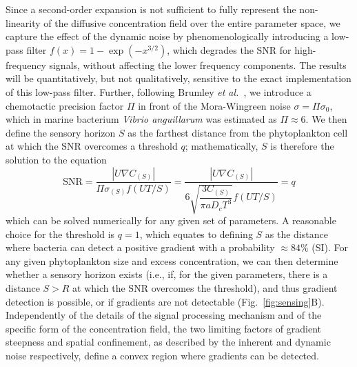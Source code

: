 \documentclass[9pt,twocolumn,twoside]{pnas-new}
\newcommand{\SNR}{\mathrm{SNR}}
\begin{document}
Since a second-order expansion is not sufficient to fully represent the non-linearity of the diffusive concentration field over the entire parameter space, we capture the effect of the dynamic noise by phenomenologically introducing a low-pass filter $f(x)=1-\exp(-x^{3/2})$, which degrades the $\SNR$ for high-frequency signals, without affecting the lower frequency components. The results will be quantitatively, but not qualitatively, sensitive to the exact implementation of this low-pass filter.
Further, following Brumley \textit{et al.}~\cite{brumley2019bacteria}, we introduce a chemotactic precision factor $\Pi$ in front of the Mora-Wingreen noise $\sigma = \Pi\sigma_0$, which in marine bacterium \textit{Vibrio anguillarum} was estimated as $\Pi\approx6$.
We then define the sensory horizon $S$ as the farthest distance from the phytoplankton cell at which the $\SNR$ overcomes a threshold $q$; mathematically, $S$ is therefore the solution to the equation
\begin{equation}
  \SNR = \dfrac{|U\nabla C_{(S)}|}{\Pi\sigma_{(S)}f(UT/S)} =
    \dfrac{|U\nabla C_{(S)}|}{6\sqrt{\dfrac{3C_{(S)}}{\pi a D_c T^3}}f(UT/S)} = q
\end{equation}
which can be solved numerically for any given set of parameters.
A reasonable choice for the threshold is $q=1$, which equates to defining $S$ as the distance where bacteria can detect a positive gradient with a probability $\approx 84\%$ (SI).
For any given phytoplankton size and excess concentration, we can then determine whether a sensory horizon exists (i.e., if, for the given parameters, there is a distance $S>R$ at which the $\SNR$ overcomes the threshold), and thus gradient detection is possible, or if gradients are not detectable (Fig.~\ref{fig:sensing}B).
Independently of the details of the signal processing mechanism and of the specific form of the concentration field, the two limiting factors of gradient steepness and spatial confinement, as described by the inherent and dynamic noise respectively, define a convex region where gradients can be detected.
\end{document}
